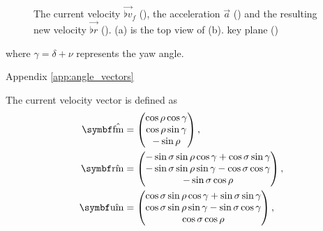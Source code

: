\begin{figure}[H]
	\centering
	\begin{subfigure}[t]{.5\textwidth}
		\centering
		\setlength\figureheight{5.5cm}
		\setlength\figurewidth{5.5cm}
		\caption{}
	\end{subfigure}%
	\begin{subfigure}[t]{.5\textwidth}
		\centering
		\setlength\figureheight{5.5cm}
		\setlength\figurewidth{5.5cm}
		\caption{}
	\end{subfigure}%
	\caption{The current velocity $\vec{\flat{v}}_f$ (\yellowarrow), the acceleration $\vec{a}$ (\orangearrow) and the resulting new velocity $\vec{\flat{r}}$ (\bluearrow). (a) is the top view of (b). key plane (\lightorangearea)}
	\label{fig:cmd}
\end{figure}


where $\gamma = \delta + \nu$ represents the yaw angle.

Appendix \ref{app:angle_vectors}

The current velocity vector is defined as
\begin{align*}
\uvec{\fmove} &=
\begin{pmatrix}
	\cos\rho\cos\gamma\\
	\cos\rho\sin\gamma\\
	-\sin\rho
\end{pmatrix},\\
\uvec{\rmove} &=
\begin{pmatrix}
	-\sin\sigma\sin\rho\cos\gamma + \cos\sigma\sin\gamma\\
	-\sin\sigma\sin\rho\sin\gamma - \cos\sigma\cos\gamma\\
	-\sin\sigma\cos\rho
\end{pmatrix},\\
\uvec{\umove} &=
\begin{pmatrix}
	\cos\sigma\sin\rho\cos\gamma + \sin\sigma\sin\gamma\\
	\cos\sigma\sin\rho\sin\gamma - \sin\sigma\cos\gamma\\
	\cos\sigma\cos\rho
\end{pmatrix},
\end{align*}


